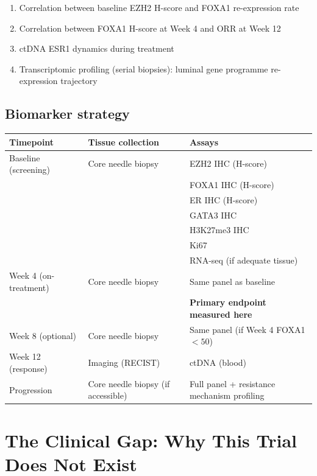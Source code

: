 \documentclass[12pt, a4paper]{article}
\begin{document}
\begin{enumerate}
  \item Correlation between baseline EZH2 H-score
        and FOXA1 re-expression rate
  \item Correlation between FOXA1 H-score at Week 4
        and ORR at Week 12
  \item ctDNA ESR1 dynamics during treatment
  \item Transcriptomic profiling (serial biopsies):
        luminal gene programme re-expression trajectory
\end{enumerate}

\subsection{Biomarker strategy}

\begin{center}
\begin{tabular}{p{3cm}p{4cm}p{5.5cm}}
\toprule
\textbf{Timepoint} & \textbf{Tissue collection}
& \textbf{Assays} \\
\midrule
Baseline (screening)
& Core needle biopsy
& EZH2 IHC (H-score)\\
& & FOXA1 IHC (H-score)\\
& & ER IHC (H-score)\\
& & GATA3 IHC\\
& & H3K27me3 IHC\\
& & Ki67\\
& & RNA-seq (if adequate tissue) \\[0.3em]
Week 4 (on-treatment)
& Core needle biopsy
& Same panel as baseline\\
& & \textbf{Primary endpoint measured here} \\[0.3em]
Week 8 (optional)
& Core needle biopsy
& Same panel (if Week 4 FOXA1 $<50$) \\[0.3em]
Week 12 (response)
& Imaging (RECIST)
& ctDNA (blood) \\[0.3em]
Progression
& Core needle biopsy (if accessible)
& Full panel + resistance mechanism profiling \\
\bottomrule
\end{tabular}
\end{center}

\section{The Clinical Gap: Why This Trial Does Not Exist}
\end{document}
